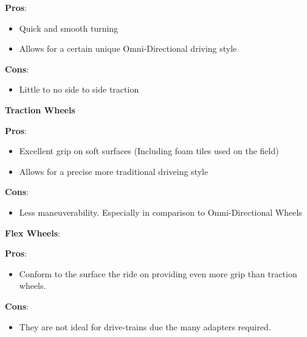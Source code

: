 \noindent
\textbf{Pros}:
\begin{itemize}
    \item Quick and smooth turning
    \item Allows for a certain unique Omni-Directional driving style
\end{itemize}
\textbf{Cons}:
\begin{itemize}
    \item Little to no side to side traction
\end{itemize}
\textbf{Traction Wheels}

\noindent
\textbf{Pros}:
\begin{itemize}
    \item Excellent grip on soft surfaces (Including foam tiles used on the field)
    \item Allows for a precise more traditional driveing style
\end{itemize}
\textbf{Cons}:
\begin{itemize}
    \item Less maneuverability. Especially in comparison to Omni-Directional Wheels
\end{itemize}
\textbf{Flex Wheels}:

\noindent
\textbf{Pros}:
\begin{itemize}
    \item  Conform to the surface the ride on providing even more grip than traction wheels.
\end{itemize}
\textbf{Cons}:
\begin{itemize}
    \item They are not ideal for drive-trains due the many adapters required.
\end{itemize}

